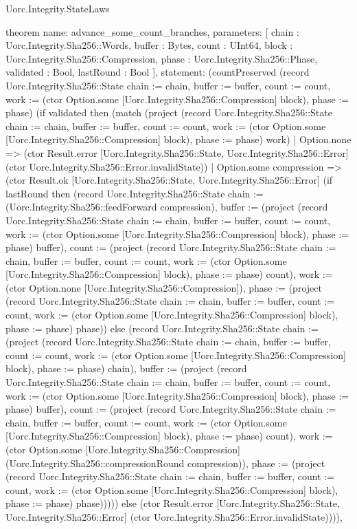 \begin{lexlean}{Uorc.Integrity.StateLaws}
\begin{semanticmodule}
theorem{
  name: advance_some_count_branches,
  parameters: [
    chain : Uorc.Integrity.Sha256::Words,
    buffer : Bytes,
    count : UInt64,
    block : Uorc.Integrity.Sha256::Compression,
    phase : Uorc.Integrity.Sha256::Phase,
    validated : Bool,
    lastRound : Bool
  ],
  statement: (countPreserved (record Uorc.Integrity.Sha256::State {chain := chain, buffer := buffer, count := count, work := (ctor Option.some [Uorc.Integrity.Sha256::Compression] block), phase := phase}) (if validated then (match (project (record Uorc.Integrity.Sha256::State {chain := chain, buffer := buffer, count := count, work := (ctor Option.some [Uorc.Integrity.Sha256::Compression] block), phase := phase}) work)
    | Option.none => (ctor Result.error [Uorc.Integrity.Sha256::State, Uorc.Integrity.Sha256::Error] (ctor Uorc.Integrity.Sha256::Error.invalidState))
    | Option.some compression => (ctor Result.ok [Uorc.Integrity.Sha256::State, Uorc.Integrity.Sha256::Error] (if lastRound then (record Uorc.Integrity.Sha256::State {chain := (Uorc.Integrity.Sha256::feedForward compression), buffer := (project (record Uorc.Integrity.Sha256::State {chain := chain, buffer := buffer, count := count, work := (ctor Option.some [Uorc.Integrity.Sha256::Compression] block), phase := phase}) buffer), count := (project (record Uorc.Integrity.Sha256::State {chain := chain, buffer := buffer, count := count, work := (ctor Option.some [Uorc.Integrity.Sha256::Compression] block), phase := phase}) count), work := (ctor Option.none [Uorc.Integrity.Sha256::Compression]), phase := (project (record Uorc.Integrity.Sha256::State {chain := chain, buffer := buffer, count := count, work := (ctor Option.some [Uorc.Integrity.Sha256::Compression] block), phase := phase}) phase)}) else (record Uorc.Integrity.Sha256::State {chain := (project (record Uorc.Integrity.Sha256::State {chain := chain, buffer := buffer, count := count, work := (ctor Option.some [Uorc.Integrity.Sha256::Compression] block), phase := phase}) chain), buffer := (project (record Uorc.Integrity.Sha256::State {chain := chain, buffer := buffer, count := count, work := (ctor Option.some [Uorc.Integrity.Sha256::Compression] block), phase := phase}) buffer), count := (project (record Uorc.Integrity.Sha256::State {chain := chain, buffer := buffer, count := count, work := (ctor Option.some [Uorc.Integrity.Sha256::Compression] block), phase := phase}) count), work := (ctor Option.some [Uorc.Integrity.Sha256::Compression] (Uorc.Integrity.Sha256::compressionRound compression)), phase := (project (record Uorc.Integrity.Sha256::State {chain := chain, buffer := buffer, count := count, work := (ctor Option.some [Uorc.Integrity.Sha256::Compression] block), phase := phase}) phase)})))) else (ctor Result.error [Uorc.Integrity.Sha256::State, Uorc.Integrity.Sha256::Error] (ctor Uorc.Integrity.Sha256::Error.invalidState)))),
}
\end{semanticmodule}
\end{lexlean}
